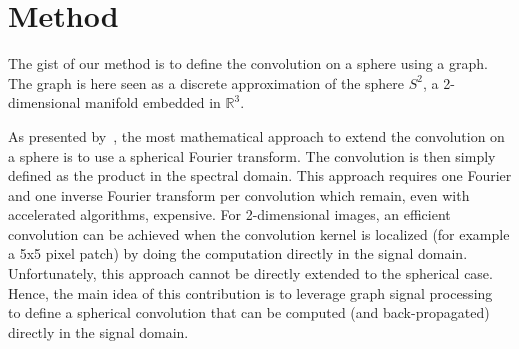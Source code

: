 \documentclass[final,twocolumn,3p,times,authoryear]{elsarticle}
\newcommand{\1}{\b{1}}              %
\newcommand{\0}{\b{0}}              %
\begin{document}
\section{Method}
\label{sec:method}

The gist of our method is to define the convolution on a sphere using a graph.
The graph is here seen as a discrete approximation of the sphere $S^2$, a
2-dimensional manifold embedded in $\mathbb{R}^3$.

As presented by~\cite{cohen2018spherical}, the most mathematical approach to
extend the convolution on a sphere is to use a spherical Fourier transform. The
convolution is then simply defined as the product in the spectral domain. This
approach requires one Fourier and one inverse Fourier transform per convolution
which remain, even with accelerated algorithms, expensive. For 2-dimensional
images, an efficient convolution can be achieved when the convolution kernel is
localized (for example a 5x5 pixel patch) by doing the computation directly in
the signal domain. Unfortunately, this approach cannot be directly extended to
the spherical case. Hence, the main idea of this contribution is to leverage
graph signal processing~\cite{shuman2013emerging} to define a spherical
convolution that can be computed (and back-propagated) directly in the signal domain.
\end{document}
